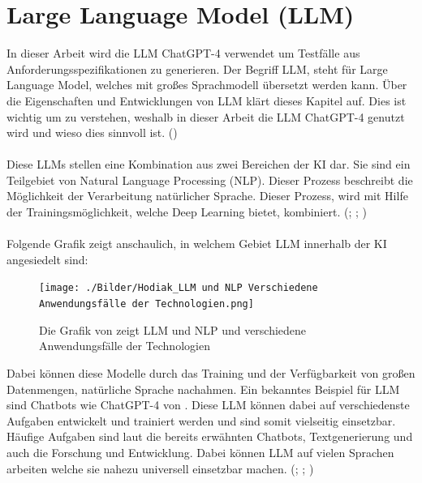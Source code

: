 \documentclass[12pt,toc=bib,toc=listof]{scrreprt}
\begin{document}
\section{Large Language Model (LLM)} %
\label{sec:llm}
In dieser Arbeit wird die LLM ChatGPT-4 verwendet um Testfälle aus Anforderungsspezifikationen zu generieren. Der Begriff LLM, steht für Large Language Model, welches mit großes Sprachmodell übersetzt werden kann. Über die Eigenschaften und Entwicklungen von LLM klärt dieses Kapitel auf. Dies ist wichtig um zu verstehen, weshalb in dieser Arbeit die LLM ChatGPT-4 genutzt wird und wieso dies sinnvoll ist. (\cite{OpenAI2025})\\
\\
Diese LLMs stellen eine Kombination aus zwei Bereichen der KI dar. Sie sind ein Teilgebiet von Natural Language Processing (NLP). Dieser Prozess beschreibt die Möglichkeit der Verarbeitung natürlicher Sprache. Dieser Prozess, wird mit Hilfe der Trainingsmöglichkeit, welche Deep Learning bietet, kombiniert. (\cite{Chang2023}; \cite{Kaddour2023}; \cite{Naveed2024})\\
\\
Folgende Grafik zeigt anschaulich, in welchem Gebiet LLM innerhalb der KI angesiedelt sind:

\begin{figure} [H]
    \centering
    \texttt{[image: ./Bilder/Hodiak\_LLM und NLP Verschiedene Anwendungsfälle der Technologien.png]}
    \caption{Die Grafik von \textcite{Hodiak2024} zeigt LLM und NLP und  verschiedene Anwendungsfälle der Technologien}
    \label{fig:enter-label}
\end{figure}
\noindent Dabei können diese Modelle durch das Training und der Verfügbarkeit von großen Datenmengen, natürliche Sprache nachahmen. Ein bekanntes Beispiel für LLM sind Chatbots wie ChatGPT-4 von \textcite{OpenAI2025}. Diese LLM können dabei auf verschiedenste Aufgaben entwickelt und trainiert werden und sind somit vielseitig einsetzbar. Häufige Aufgaben sind laut \textcite{Kerner2024} die bereits erwähnten Chatbots, Textgenerierung und auch die Forschung und Entwicklung. Dabei können LLM auf vielen Sprachen arbeiten welche sie nahezu universell einsetzbar machen. (\cite{Chang2023}; \cite{Kaddour2023}; \cite{Naveed2024})
\end{document}
